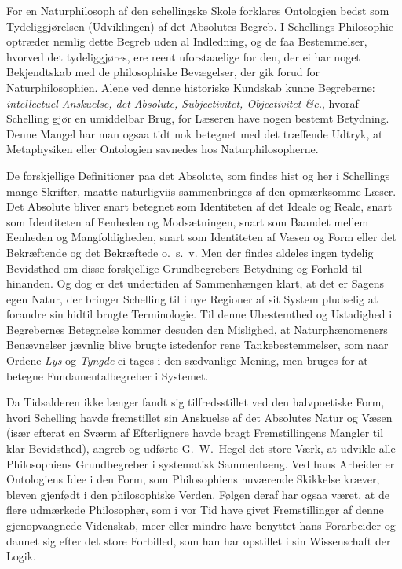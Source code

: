 \documentclass[12pt]{article}
\newcommand{\opage}[1]{\marginnote{\footnotesize\textit{[#1]}}}
\begin{document}
For en Naturphilosoph af den schellingske Skole forklares Ontologien bedst som
Tydeliggjørelsen (Udviklingen) af det Absolutes Begreb. I Schellings
Philosophie optræder nemlig dette Begreb uden al Indledning, og de faa
Bestemmelser, hvorved det tydeliggjøres, ere reent uforstaaelige for den, der ei
har noget Bekjendtskab med de philosophiske Bevægelser, der gik forud
\opage{194}for Naturphilosophien. Alene ved denne historiske Kundskab kunne
Begreberne: \emph{intellectuel Anskuelse, det Absolute, Subjectivitet,
Objectivitet \&c.}, hvoraf Schelling gjør en umiddelbar Brug, for Læseren have
nogen bestemt Betydning. Denne Mangel har man ogsaa tidt nok betegnet med det
træffende Udtryk, at Metaphysiken eller Ontologien savnedes hos
Naturphilosopherne.

De forskjellige Definitioner paa det Absolute, som findes hist og her i
Schellings mange Skrifter, maatte naturligviis sammenbringes af den opmærksomme
Læser. Det Absolute bliver snart betegnet som Identiteten af det Ideale og
Reale, snart som Identiteten af Eenheden og Modsætningen, snart som Baandet
mellem Eenheden og Mangfoldigheden, snart som Identiteten af Væsen og Form eller
det Bekræftende og det Bekræftede o.\ s.\ v. Men der findes aldeles ingen
tydelig Bevidsthed om disse forskjellige Grundbegrebers Betydning og Forhold til
hinanden. Og dog er det undertiden af Sammenhængen klart, at det er Sagens egen
Natur, der bringer Schelling til i nye Regioner af sit System pludselig at
forandre sin hidtil brugte Terminologie. Til denne Ubestemthed og Ustadighed i
Begrebernes Betegnelse kommer desuden den Mislighed, at Naturphænomeners
Benævnelser jævnlig blive brugte istedenfor rene Tankebestemmelser, som naar
Ordene \emph{Lys} og \emph{Tyngde} ei tages i den sædvanlige Mening, men bruges
for at betegne Fundamentalbegreber i Systemet.

Da Tidsalderen ikke længer fandt sig tilfredsstillet ved den halvpoetiske Form,
hvori Schelling havde fremstillet sin Anskuelse af det Absolutes Natur og Væsen
(især efterat en Sværm af Efterlignere havde bragt Fremstillingens Mangler til
klar Bevidsthed), angreb og udførte G.\ W.\ Hegel det store Værk, at udvikle
alle Philosophiens Grundbegreber i systematisk Sammenhæng. Ved hans Arbeider er
Ontologiens Idee i den Form, som Philosophiens nuværende Skikkelse kræver,
bleven gjenfødt i den philoso\opage{195}phiske Verden. Følgen deraf har ogsaa
været, at de flere udmærkede Philosopher, som i vor Tid have givet
Fremstillinger af denne gjenopvaagnede Videnskab, meer eller mindre have benyttet
hans Forarbeider og dannet sig efter det store Forbilled, som han har opstillet i
sin Wissenschaft der Logik.
\end{document}
